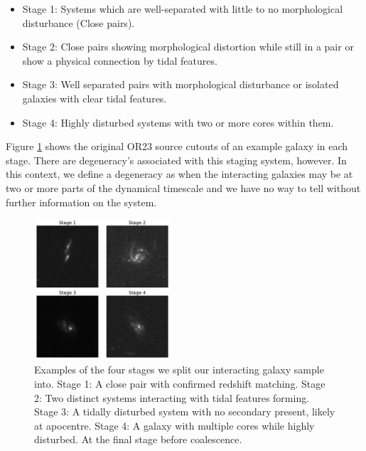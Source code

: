 \begin{itemize}
    \item Stage 1: Systems which are well-separated with little to no morphological disturbance (Close pairs).
    \item Stage 2: Close pairs showing morphological distortion while still in a pair or show a physical connection by tidal features.
    \item Stage 3: Well separated pairs with morphological disturbance or isolated galaxies with clear tidal features.
    \item Stage 4: Highly disturbed systems with two or more cores within them.
\end{itemize}

\noindent Figure \ref{fig:stages} shows the original OR23 source cutouts of an example galaxy in each stage. There are degeneracy's associated with this staging system, however. In this context, we define a degeneracy as when the interacting galaxies may be at two or more parts of the dynamical timescale and we have no way to tell without further information on the system.

\begin{figure}
    \centering
    \includegraphics[width=0.45\textwidth]{Chapter3/figures/examples-stages.pdf}
    \caption{Examples of the four stages we split our interacting galaxy sample into. Stage 1: A close pair with confirmed redshift matching. Stage 2: Two distinct systems interacting with tidal features forming. Stage 3: A tidally disturbed system with no secondary present, likely at apocentre. Stage 4: A galaxy with multiple cores while highly disturbed. At the final stage before coalescence.}
    \label{fig:stages}
\end{figure}

